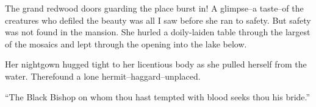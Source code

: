 \documentclass{article}
\begin{document}
\noindent
The grand redwood doors guarding the place burst in!
A glimpse--a taste--of the creatures who defiled
the beauty was all I saw before she ran to safety.
But safety was not found in the mansion.
She hurled a doily-laiden table through the largest
of the mosaics and lept through the opening
into the lake below.


Her nightgown hugged tight to her licentious body
as she pulled herself from the water.
Therefound a lone hermit--haggard--unplaced.


``The Black Bishop on whom thou hast tempted
with blood seeks thou his bride.''






\end{document}
